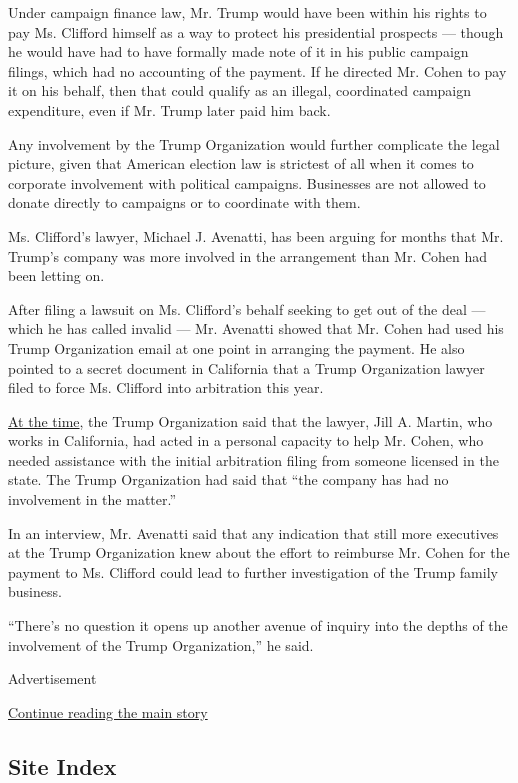 Under campaign finance law, Mr. Trump would have been within his rights
to pay Ms. Clifford himself as a way to protect his presidential
prospects --- though he would have had to have formally made note of it
in his public campaign filings, which had no accounting of the payment.
If he directed Mr. Cohen to pay it on his behalf, then that could
qualify as an illegal, coordinated campaign expenditure, even if Mr.
Trump later paid him back.

Any involvement by the Trump Organization would further complicate the
legal picture, given that American election law is strictest of all when
it comes to corporate involvement with political campaigns. Businesses
are not allowed to donate directly to campaigns or to coordinate with
them.

Ms. Clifford's lawyer, Michael J. Avenatti, has been arguing for months
that Mr. Trump's company was more involved in the arrangement than Mr.
Cohen had been letting on.

After filing a lawsuit on Ms. Clifford's behalf seeking to get out of
the deal --- which he has called invalid --- Mr. Avenatti showed that
Mr. Cohen had used his Trump Organization email at one point in
arranging the payment. He also pointed to a secret document in
California that a Trump Organization lawyer filed to force Ms. Clifford
into arbitration this year.

\href{https://www.wsj.com/articles/top-trump-company-lawyer-worked-to-silence-stormy-daniels-1521072252?tesla=y\&mod=breakingnews}{At
the time}, the Trump Organization said that the lawyer, Jill A. Martin,
who works in California, had acted in a personal capacity to help Mr.
Cohen, who needed assistance with the initial arbitration filing from
someone licensed in the state. The Trump Organization had said that
``the company has had no involvement in the matter.''

In an interview, Mr. Avenatti said that any indication that still more
executives at the Trump Organization knew about the effort to reimburse
Mr. Cohen for the payment to Ms. Clifford could lead to further
investigation of the Trump family business.

``There's no question it opens up another avenue of inquiry into the
depths of the involvement of the Trump Organization,'' he said.

Advertisement

\protect\hyperlink{after-bottom}{Continue reading the main story}

\hypertarget{site-index}{%
\subsection{Site Index}\label{site-index}}

